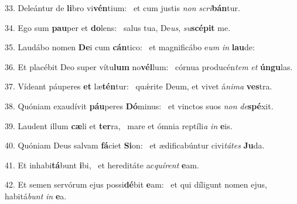 33. Deleántur de \textbf{li}bro vi\textbf{vén}tium: \ast\  et cum justis \textit{non} \textit{scri}\textbf{bán}tur.\

34. Ego sum \textbf{pau}per et \textbf{do}lens: \ast\  salus tua, De\textit{us}, \textit{su}\textbf{scé}\textbf{pit} me.\

35. Laudábo nomen \textbf{De}i cum \textbf{cán}tico: \ast\  et magnificábo e\textit{um} \textit{in} \textbf{lau}de:\

36. Et placébit Deo super vítu\textbf{lum} no\textbf{vél}lum: \ast\  córnua producén\textit{tem} \textit{et} \textbf{ún}\textbf{gu}las.\

37. Vídeant páuperes \textbf{et} læ\textbf{tén}tur: \ast\  quǽrite Deum, et vivet á\textit{ni}\textit{ma} \textbf{ves}tra.\

38. Quóniam exaudívit \textbf{páu}peres \textbf{Dó}minus: \ast\  et vinctos suos \textit{non} \textit{de}\textbf{spé}xit.\

39. Laudent illum \textbf{cæ}li et \textbf{ter}ra, \ast\  mare et ómnia reptíli\textit{a} \textit{in} \textbf{e}is.\

40. Quóniam Deus salvam \textbf{fá}ciet \textbf{Si}on: \ast\  et ædificabúntur civi\textit{tá}\textit{tes} \textbf{Ju}da.\

41. Et inhabi\textbf{tá}bunt \textbf{i}bi, \ast\  et hereditáte ac\textit{quí}\textit{rent} \textbf{e}am.\

42. Et semen servórum ejus possi\textbf{dé}bit \textbf{e}am: \ast\  et qui díligunt nomen ejus, habitá\textit{bunt} \textit{in} \textbf{e}a.\

